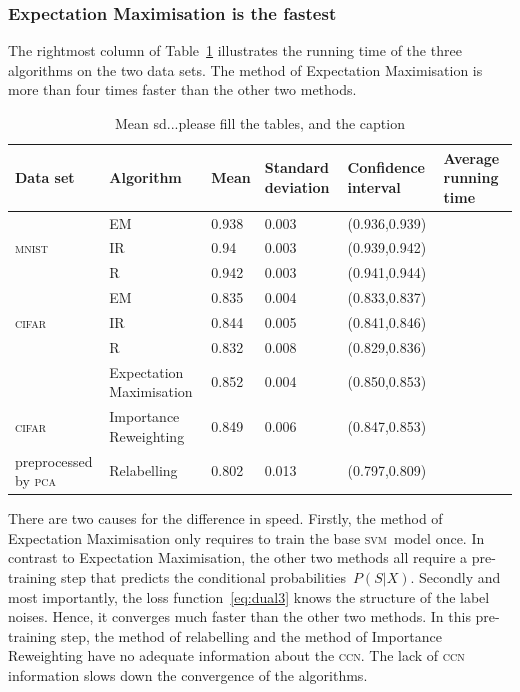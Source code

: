 \documentclass[12pt]{article} %
\newcommand{\svm}{\textsc{svm}}
\begin{document}
\subsubsection{Expectation Maximisation is the fastest}
The rightmost column of Table~\ref{tab:Meansd} illustrates the running time of the three algorithms on the two data sets.
The method of Expectation Maximisation is more than four times faster than the other two methods.
\begin{table}
	\caption{Mean sd...please fill the tables, and the caption}
	\label{tab:Meansd}

\centering
\begin{tabular}{@{}llllll@{}}
\toprule
Data set& Algorithm&Mean  & Standard deviation & Confidence interval & Average running time \\ \midrule
&EM&0.938 & 0.003              & (0.936,0.939)     &  \\
\textsc{mnist} &IR&0.94  & 0.003              & (0.939,0.942)     &   \\
&R&0.942 & 0.003              & (0.941,0.944)     &\\
\midrule
&EM&0.835 & 0.004              & (0.833,0.837)     &  \\
\textsc{cifar}&IR&0.844 & 0.005              & (0.841,0.846)     &  \\
  &R&0.832 & 0.008              & (0.829,0.836)     & \\ 
\midrule
&Expectation Maximisation&0.852 & 0.004              & (0.850,0.853)     &  \\
\textsc{cifar} &Importance Reweighting& 0.849 & 0.006              & (0.847,0.853)     &  \\
preprocessed by \textsc{pca}  &Relabelling& 0.802 & 0.013              & (0.797,0.809)     & \\ 
\bottomrule
\end{tabular}
\end{table}
There are two  causes for the difference in speed.
Firstly, the method of Expectation Maximisation only requires to train the base \svm\ model once.
In contrast to Expectation Maximisation, the other two methods all require a pre-training step that predicts the conditional probabilities~$P(S|X)$.
Secondly and most importantly, the loss function~\eqref{eq:dual3} knows the structure of the label noises. Hence, it converges much faster than the other two methods.
In this pre-training step, the method of relabelling and the method of Importance Reweighting have no adequate information about the \textsc{ccn}.
The lack of \textsc{ccn} information slows down the convergence of the algorithms.
\end{document}
